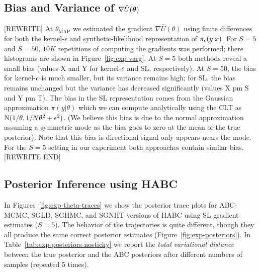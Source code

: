 \documentclass[]{article}
\begin{document}
 



\subsection{Bias and Variance of $\nabla \hat{U}({\bm \theta})$}
[REWRITE] At $\theta_{\text{MAP}}$ we estimated the gradient $\nabla \hat{U}(\theta)$ using finite differences for both the kernel-$\epsilon$ and synthetic-likelihood representation of $\pi_{\epsilon}(y | x )$.  For $S=5$ and $S=50$, $10K$ repetitions of computing the gradients was performed; there histograms are shown in Figure~\ref{fig:exp-varg}.  At $S=5$ both methods reveal a small bias (values X and Y for kernel-$\epsilon$ and SL, respectively).  At $S=50$, the bias for kernel-$\epsilon$ is much smaller, but its variance remains high; for SL, the bias remains unchanged but the variance has decreased significantly (values X pm S and Y pm T). The bias in the SL representation comes from the Gaussian approximation $\pi(y|\theta)$ which we can compute analytically using the CLT as $\text{N}( 1/\theta, 1/N \theta^2 + \epsilon^2)$. 
(We believe this bias is due to the normal approximation assuming a symmetric mode as the bias goes to zero at the mean of the true posterior).  Note that this bias is directional signal only appears nears the mode.  For the $S=5$ setting in our experiment both approaches contain similar bias. [REWRITE END]




\subsection{Posterior Inference using HABC}
In Figures~\ref{fig:exp-theta-traces} we show the posterior trace plots for ABC-MCMC, SGLD, SGHMC, and SGNHT versions of HABC using SL gradient estimates ($S=5$).  The behavior of the trajectories is quite different, though they all produce the same correct posterior estimates (Figure~\ref{fig:exp-posteriors}).  In Table~\ref{tab:exp-posteriors-nosticky} we report the {\em total variational distance} between the true posterior and the ABC posteriors after different numbers of samples (repeated 5 times).

\end{document}
